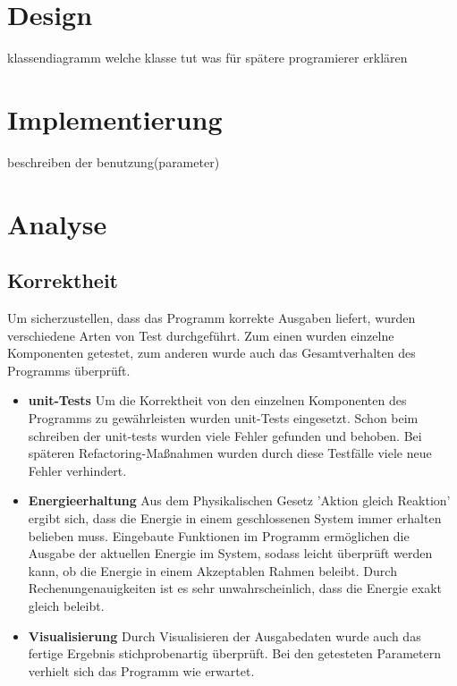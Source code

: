 \documentclass[
	12pt,
	a4paper,
	BCOR10mm,
	DIV14,
	headsepline,
]{scrreprt}
\begin{document}
\section{Design}

klassendiagramm
welche klasse tut was
für spätere programierer erklären

\section{Implementierung}

beschreiben der benutzung(parameter)

\section{Analyse}
\subsection{Korrektheit}
Um sicherzustellen, dass das Programm korrekte Ausgaben liefert, wurden verschiedene Arten von Test durchgeführt. Zum einen wurden einzelne Komponenten getestet, zum anderen wurde auch das Gesamtverhalten des Programms überprüft.
\begin{itemize}
	\item \textbf{unit-Tests} Um die Korrektheit von den einzelnen Komponenten des Programms zu gewährleisten wurden unit-Tests eingesetzt. Schon beim schreiben der unit-tests wurden viele Fehler gefunden und behoben. Bei späteren Refactoring-Maßnahmen wurden durch diese Testfälle viele neue Fehler verhindert.
	\item \textbf{Energieerhaltung} Aus dem Physikalischen Gesetz 'Aktion gleich Reaktion' ergibt sich, dass die Energie in einem geschlossenen System immer erhalten belieben muss. Eingebaute Funktionen im Programm ermöglichen die Ausgabe der aktuellen Energie im System, sodass leicht überprüft werden kann, ob die Energie in einem Akzeptablen Rahmen beleibt. Durch Rechenungenauigkeiten ist es sehr unwahrscheinlich, dass die Energie exakt gleich beleibt.
	\item \textbf{Visualisierung} Durch Visualisieren der Ausgabedaten wurde auch das fertige Ergebnis stichprobenartig überprüft. Bei den getesteten Parametern verhielt sich das Programm wie erwartet.
\end{itemize}
\end{document}
